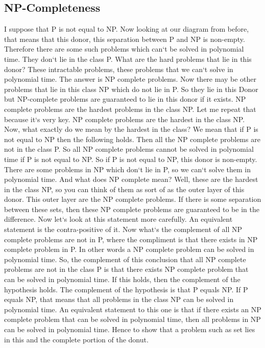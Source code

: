 \subsection{NP-Completeness}
I suppose that P is not equal to NP\@.
Now looking at our diagram from before, that means that this donor, this separation between P and NP is non-empty.
Therefore there are some such problems which can`t be solved in polynomial time.
They don`t lie in the class P\@.
What are the hard problems that lie in this donor? These intractable problems, these problems that we can`t solve in polynomial time.
The answer is NP complete problems.
Now there may be other problems that lie in this class NP which do not lie in P\@.
So they lie in this Donor but NP-complete problems are guaranteed to lie in this donor if it exists.
NP complete problems are the hardest problems in the class NP\@.
Let me repeat that because it`s very key.
NP complete problems are the hardest in the class NP\@.
Now, what exactly do we mean by the hardest in the class? We mean that if P is not equal to NP then the following holds.
Then all the NP complete problems are not in the class P\@.
So all NP complete problems cannot be solved in polynomial time if P is not equal to NP\@.
So if P is not equal to NP, this donor is non-empty.
There are some problems in NP which don`t lie in P, so we can`t solve them in polynomial time.
And what does NP complete mean? Well, these are the hardest in the class NP, so you can think of them as sort of as the outer layer of this donor.
This outer layer are the NP complete problems.
If there is some separation between these sets, then these NP complete problems are guaranteed to be in the difference.
Now let`s look at this statement more carefully.
An equivalent statement is the contra-positive of it.
Now what`s the complement of all NP complete problems are not in P, where the compliment is that there exists in NP complete problem in P\@.
In other words a NP complete problem can be solved in polynomial time.
So, the complement of this conclusion that all NP complete problems are not in the class P is that there exists NP complete problem that can be solved in polynomial time.
If this holds, then the complement of the hypothesis holds.
The complement of the hypothesis is that P equals NP\@.
If P equals NP, that means that all problems in the class NP can be solved in polynomial time.
An equivalent statement to this one is that if there exists an NP complete problem that can be solved in polynomial time, then all problems in NP can be solved in polynomial time.
Hence to show that a problem such as set lies in this and the complete portion of the donut.
